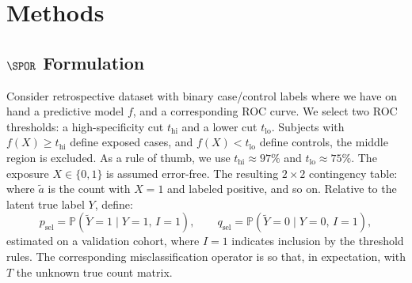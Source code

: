 \documentclass[lineno]{biometrika}
\begin{document}
\section{Methods}
\subsection{$\SPOR$ Formulation}
Consider retrospective dataset with binary case/control labels where we have on hand a  predictive model $f$, and a corresponding ROC curve. We select two  ROC thresholds: a high-specificity cut $t_{\mathrm{hi}}$ and a lower cut $t_{\mathrm{lo}}$. Subjects with $f(X) \ge t_{\mathrm{hi}}$ define exposed cases, and  $f(X) < t_{\mathrm{lo}}$ define controls, the middle region is excluded. As a rule of thumb, we use $t_{\mathrm{hi}} \approx 97\%$ and $t_{\mathrm{lo}} \approx 75\%$. The exposure $X\in\{0,1\}$ is assumed error-free. The resulting $2\times 2$ contingency table:
%
where $\tilde{a}$ is the count with $X=1$ and labeled positive, and so on. Relative to the latent true label $Y$, define:
\[
p_{\text{sel}} = \mathbb{P}(\tilde{Y}=1 \mid Y=1,\, I=1), \qquad
q_{\text{sel}} = \mathbb{P}(\tilde{Y}=0 \mid Y=0,\, I=1),
\]
estimated on a validation cohort, where $I=1$ indicates inclusion by the threshold rules. The corresponding misclassification operator is
so that, in expectation,
with $T$ the unknown true count matrix.
\end{document}

